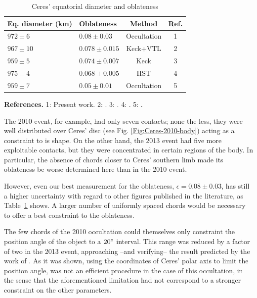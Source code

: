 \documentclass[useAMS,usenatbib]{mn2e}
\begin{document}
\begin{table}
  \caption{Ceres' equatorial diameter and oblateness \label{Tab: Ceres-final}}
  \begin{centering}
  \begin{tabular}{@{}llcc}
  \hline
     Eq. diameter (km) & Oblateness & Method & Ref. \\
\hline
$972 \pm 6$  & $0.08  \pm 0.03$  & Occultation & 1\\
$967 \pm 10$ & $0.078 \pm 0.015$ & Keck+VTL    & 2 \\
$959 \pm 5$  & $0.074 \pm 0.007$ & Keck        & 3\\
$975 \pm 4$  & $0.068 \pm 0.005$ & HST         & 4\\
$959 \pm 7$  & $0.05  \pm 0.01$  & Occultation & 5\\
\hline
\end{tabular}
\par\end{centering}
\textbf{References.} 1: Present work. 2: \cite{Drummond2014}. 3: \cite{Carry2008}. 4: \cite{Thomas2005}. 5: \cite{Millis1987}.
\end{table}

The 2010 event, for example, had only seven contacts; none the less, they were well distributed over Ceres' disc (see Fig. \ref{Fig:Ceres-2010-body}) acting as a constraint to is shape. On the other hand, the 2013 event had five more exploitable contacts, but they were concentrated in certain regions of the body. In particular, the absence of chords closer to Ceres' southern limb made its oblateness be worse determined here than in the 2010 event.

However, even our best measurement for the oblateness, $\epsilon=0.08 \pm 0.03$, has still a higher uncertainty with regard to other figures published in the literature, as Table~\ref{Tab: Ceres-final} shows. A larger number of uniformly spaced chords would be necessary to offer a best constraint to the oblateness. 

The few chords of the 2010 occultation could themselves only constraint the position angle of the object to a $20\hbox{$^\circ$}$ interval. This range was reduced by a factor of two in the 2013 event, approaching --and verifying-- the result predicted by the work of \cite{Drummond2014}. As it was shown, using the coordinates of Ceres' polar axis to limit the position angle, was not an efficient procedure in the case of this occultation, in the sense that the aforementioned limitation had not correspond to a stronger constraint on the other parameters.
\end{document}
